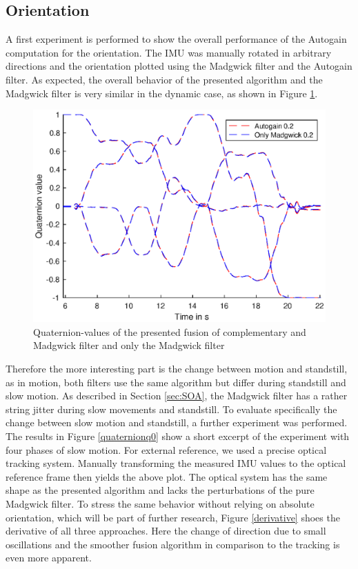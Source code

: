 \documentclass[letterpaper, 10 pt, conference]{ieeeconf}  %
\begin{document}
\subsection{Orientation}
A first experiment is performed to show the overall performance of the Autogain computation for the orientation. The IMU was manually rotated in arbitrary directions and the orientation plotted using the Madgwick filter and the Autogain filter.
As expected, the overall behavior of the presented algorithm and the Madgwick filter is very similar in the dynamic case, as shown in Figure \ref{quaternion1}.
\begin{figure}[thpb]
\includegraphics[width=\linewidth]{./graphics/AutoVsMad.eps}
\caption{Quaternion-values of the presented fusion of complementary and Madgwick filter and only the Madgwick filter}
\label{quaternion1}
\end{figure}
Therefore the more interesting part is the change between motion and standstill, as in motion, both filters use the same algorithm but differ during standstill and slow motion.
As described in Section \ref{sec:SOA}, the Madgwick filter has a rather string jitter during slow movements and standstill. 
To evaluate specifically the change between slow motion and standstill, a further experiment was performed. The results in Figure \ref{quaternionq0} show a short excerpt of the experiment with four phases of slow motion.
For external reference, we used a precise optical tracking system. 
Manually transforming the measured IMU values to the optical reference frame then
yields the above plot.
The optical system has the same shape as the presented algorithm and lacks the perturbations of the pure Madgwick filter.
To stress the same behavior without relying on absolute orientation, which will be part of further research, Figure \ref{derivative} shoes the derivative of all three approaches.
Here the change of direction due to small oscillations and the smoother fusion algorithm in comparison to the tracking is even more apparent.
\end{document}
